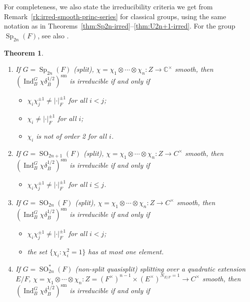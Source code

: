 \documentclass[a4paper]{amsart}
\numberwithin{equation}{section}
\newtheorem{thm}{Theorem}[section]
\theoremstyle{remark}
\theoremstyle{definition}
\DeclareMathOperator{\Ind}{Ind}
\newcommand{\C}{\mathbb{C}}
\DeclareMathOperator{\Sp}{Sp}
\DeclareMathOperator{\SO}{SO}
\newcommand{\sm}{\mathrm{sm}}
\begin{document}
For completeness, we also state the irreducibility criteria we get from Remark~\ref{rk:irred-smooth-princ-series} for classical groups, using the
same notation as in Theorems~\ref{thm:Sp2n-irred}--\ref{thm:U2n+1-irred}.
For the group $\Sp_{2n}(F)$, see also \cite[Theorem 7.1]{MR1266251}.

\begin{thm}\label{thm:irred-smooth-classical-grps}\ 

  \begin{enumerate}
  \item If $G = \Sp_{2n}(F)$ (split), $\chi = \chi_{1}\otimes\cdots\otimes\chi_{n}\colon Z\to \C^{\times}$ smooth, then
    $(\Ind_{B}^{G}\chi\delta_B^{1/2})^{\sm}$ is irreducible if and only if
    \begin{itemize}
    \item $\chi_i \chi_j^{\pm 1} \ne \lvert \cdot\rvert_F^{\pm 1}$ for all $i < j$;
    \item $\chi_i \ne \lvert \cdot\rvert_F^{\pm 1}$ for all $i$;
    \item $\chi_i$ is not of order 2 for all $i$.     \end{itemize}
  \item If $G = \SO_{2n+1}(F)$ (split), $\chi = \chi_{1}\otimes\cdots\otimes\chi_{n}\colon Z\to C^{\times}$ smooth, then
    $(\Ind_{B}^{G}\chi\delta_B^{1/2})^{\sm}$ is irreducible if and only if
    \begin{itemize}
    \item $\chi_i \chi_j^{\pm 1} \ne \lvert \cdot\rvert_F^{\pm 1}$ for all $i \le j$.
    \end{itemize}
  \item If $G = \SO_{2n}(F)$ (split), $\chi = \chi_{1}\otimes\cdots\otimes\chi_{n}\colon Z\to C^{\times}$ smooth, then
    $(\Ind_{B}^{G}\chi\delta_B^{1/2})^{\sm}$ is irreducible if and only if
    \begin{itemize}
    \item $\chi_i \chi_j^{\pm 1} \ne \lvert \cdot\rvert_F^{\pm 1}$ for all $i < j$;
    \item the set $\{\chi_i : \chi_i^2 = 1\}$ has at most one element.      \end{itemize}
  \item If $G = \SO^*_{2n}(F)$ (non-split quasisplit) splitting over a quadratic extension $E/F$, $\chi = \chi_{1}\otimes\cdots\otimes\chi_{n}\colon Z = (F^\times)^{n-1} \times (E^\times)^{N_{E/F}=1}\to C^{\times}$ smooth, then
    $(\Ind_{B}^{G}\chi\delta_B^{1/2})^{\sm}$ is irreducible if and only if

\end{enumerate}
\end{thm}
\end{document}

